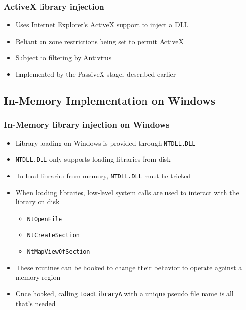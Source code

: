 \documentclass{beamer}
\newenvironment{sitemize}{\vspace{1mm}\begin{itemize}\itemsep 4pt\small}{\end{itemize}}
\begin{document}
\begin{frame}[t]
    \frametitle{ActiveX library injection}

    \begin{sitemize}
        \item Uses Internet Explorer's ActiveX support to inject a DLL
        \item Reliant on zone restrictions being set to permit ActiveX

        \pause
        \item Subject to filtering by Antivirus

        \pause
        \item Implemented by the PassiveX stager described earlier
    \end{sitemize}
\end{frame}

\subsection{In-Memory Implementation on Windows}

\begin{frame}[t]
    \frametitle{In-Memory library injection on Windows}

    \begin{sitemize}
        \item Library loading on Windows is provided through \texttt{NTDLL.DLL}
        \item \texttt{NTDLL.DLL} only supports loading libraries from disk
    \end{sitemize}

    \pause
    \begin{sitemize}
        \item To load libraries from memory, \texttt{NTDLL.DLL} must be tricked

        \pause
        \item When loading libraries, low-level system calls are used to interact with the library on disk
        \begin{sitemize}
            \item \texttt{NtOpenFile}
            \item \texttt{NtCreateSection}
            \item \texttt{NtMapViewOfSection}
        \end{sitemize}
        \item These routines can be hooked to change their behavior to operate against a memory region
    \end{sitemize}

    \pause
    \begin{sitemize}
        \item Once hooked, calling \texttt{LoadLibraryA} with a unique pseudo file name is all that's needed
    \end{sitemize}
\end{frame}
\end{document}
